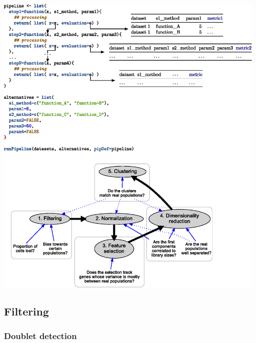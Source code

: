 \documentclass{bmcart}
\begin{document}
\includegraphics[scale=0.8]{figure0}

\subsection*{Filtering}

\subsubsection*{Doublet detection}
\end{document}

